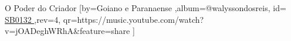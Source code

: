 \beginsong
{O Poder do Criador %
}[by={Goiano e Paranaense %
},album={@walyssondosreis},
id={\href{https://music.youtube.com/watch?v=jOADeghWRhA&feature=share
}{ SB0132 %
}},rev={4}, %
qr={https://music.youtube.com/watch?v=jOADeghWRhA&feature=share %
}]

\lstset{basicstyle=\scriptsize\bf} %

